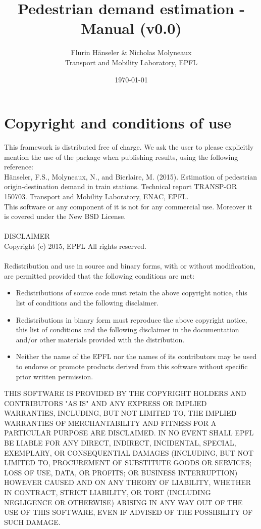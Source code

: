 \documentclass[a4paper,12pt]{article}
\begin{document}
\setlength{\parindent}{0pt}

\title{Pedestrian demand estimation - Manual (v0.0)}
\author{Flurin H\"anseler \& Nicholas Molyneaux \\ Transport and Mobility Laboratory, EPFL}
\date{\today}
\maketitle
\tableofcontents
\newpage
\section{Copyright and conditions of use}
This framework is distributed free of charge. We ask the user to please explicitly mention the use of the package when publishing results, using the following reference:\\
Hänseler, F.S., Molyneaux, N., and Bierlaire, M. (2015). Estimation of pedestrian origin-destination demand in train stations. Technical report TRANSP-OR 150703. Transport and Mobility Laboratory, ENAC, EPFL.\\
This software or any component of it is not for any commercial use. Moreover it is covered under the New BSD License.\\
\\
DISCLAIMER\\
Copyright (c) 2015, EPFL All rights reserved.\\
\\
Redistribution and use in source and binary forms, with or without modification, are permitted provided that the following conditions are met:
\begin{itemize}
\item Redistributions of source code must retain the above copyright notice, this list of conditions and the following disclaimer.
\item Redistributions in binary form must reproduce the above copyright notice, this list of conditions and the following disclaimer in the documentation and/or other materials provided with the distribution.
\item Neither the name of the EPFL nor the names of its contributors may be used to endorse or promote products derived from this software without specific prior written permission.
\end{itemize}
THIS SOFTWARE IS PROVIDED BY THE COPYRIGHT HOLDERS AND CONTRIBUTORS "AS IS" AND ANY EXPRESS OR IMPLIED WARRANTIES, INCLUDING, BUT NOT LIMITED TO, THE IMPLIED WARRANTIES OF MERCHANTABILITY AND FITNESS FOR A PARTICULAR PURPOSE ARE DISCLAIMED. IN NO EVENT SHALL EPFL BE LIABLE FOR ANY DIRECT, INDIRECT, INCIDENTAL, SPECIAL, EXEMPLARY, OR CONSEQUENTIAL DAMAGES (INCLUDING, BUT NOT LIMITED TO, PROCUREMENT OF SUBSTITUTE GOODS OR SERVICES; LOSS OF USE, DATA, OR PROFITS; OR BUSINESS INTERRUPTION) HOWEVER CAUSED AND ON ANY THEORY OF LIABILITY, WHETHER IN CONTRACT, STRICT LIABILITY, OR TORT (INCLUDING NEGLIGENCE OR OTHERWISE) ARISING IN ANY WAY OUT OF THE USE OF THIS SOFTWARE, EVEN IF ADVISED OF THE POSSIBILITY OF SUCH DAMAGE.
\newpage
\end{document}
